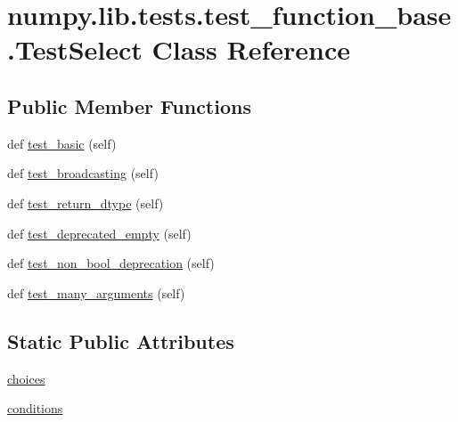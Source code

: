 \hypertarget{classnumpy_1_1lib_1_1tests_1_1test__function__base_1_1TestSelect}{}\section{numpy.\+lib.\+tests.\+test\+\_\+function\+\_\+base.\+Test\+Select Class Reference}
\label{classnumpy_1_1lib_1_1tests_1_1test__function__base_1_1TestSelect}
\subsection*{Public Member Functions}
\begin{DoxyCompactItemize}
\item 
def \hyperlink{classnumpy_1_1lib_1_1tests_1_1test__function__base_1_1TestSelect_abbd28a18f94011b3b0c58cdfb5e0e340}{test\+\_\+basic} (self)
\item 
def \hyperlink{classnumpy_1_1lib_1_1tests_1_1test__function__base_1_1TestSelect_a74684fd2ebca90a8812a80ee8b97640c}{test\+\_\+broadcasting} (self)
\item 
def \hyperlink{classnumpy_1_1lib_1_1tests_1_1test__function__base_1_1TestSelect_aabdf02f09d9b36c948381d0e31c5fde2}{test\+\_\+return\+\_\+dtype} (self)
\item 
def \hyperlink{classnumpy_1_1lib_1_1tests_1_1test__function__base_1_1TestSelect_a5267529084832442037aeab17b424d87}{test\+\_\+deprecated\+\_\+empty} (self)
\item 
def \hyperlink{classnumpy_1_1lib_1_1tests_1_1test__function__base_1_1TestSelect_a1731d7a5b3ed0665b32bfc430bef8643}{test\+\_\+non\+\_\+bool\+\_\+deprecation} (self)
\item 
def \hyperlink{classnumpy_1_1lib_1_1tests_1_1test__function__base_1_1TestSelect_abef72fe54969849796708f862086f907}{test\+\_\+many\+\_\+arguments} (self)
\end{DoxyCompactItemize}
\subsection*{Static Public Attributes}
\begin{DoxyCompactItemize}
\item 
\hyperlink{classnumpy_1_1lib_1_1tests_1_1test__function__base_1_1TestSelect_a554c9ff6ea31d5c1122dbfeae4bd5052}{choices}
\item 
\hyperlink{classnumpy_1_1lib_1_1tests_1_1test__function__base_1_1TestSelect_ab2fbbd19138213c901776d453a2d15b1}{conditions}
\end{DoxyCompactItemize}


